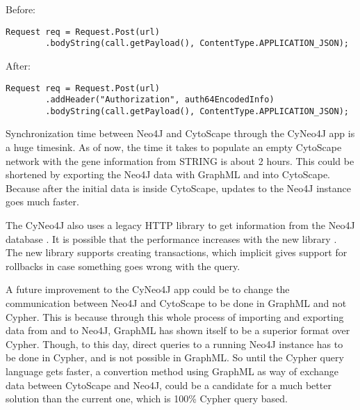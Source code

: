 Before:
\begin{verbatim}
Request req = Request.Post(url)
        .bodyString(call.getPayload(), ContentType.APPLICATION_JSON);
\end{verbatim}

After:
\begin{verbatim}
Request req = Request.Post(url)
        .addHeader("Authorization", auth64EncodedInfo)
        .bodyString(call.getPayload(), ContentType.APPLICATION_JSON);
\end{verbatim}

Synchronization time between Neo4J and CytoScape through the CyNeo4J app is a
huge timesink. As of now, the time it takes to populate an empty CytoScape
network with the gene information from STRING is about 2 hours. This could be
shortened by exporting the Neo4J data with GraphML and into CytoScape. Because
after the initial data is inside CytoScape, updates to the Neo4J instance goes
much faster.

The CyNeo4J also uses a legacy HTTP library to get information from the Neo4J
database \cite{legacy-neo4j}. It is possible that the performance increases with
the new library \cite{transactional-neo4j}. The new library supports creating
transactions, which implicit gives support for rollbacks in case something goes
wrong with the query.

A future improvement to the CyNeo4J app could be to change the communication
between Neo4J and CytoScape to be done in GraphML and not Cypher. This is
because through this whole process of importing and exporting data from and to
Neo4J, GraphML has shown itself to be a superior format over Cypher. Though, to
this day, direct queries to a running Neo4J instance has to be done in Cypher,
and is not possible in GraphML. So until the Cypher query language gets faster,
a convertion method using GraphML as way of exchange data between CytoScape and
Neo4J, could be a candidate for a much better solution than the current one,
which is 100\% Cypher query based.

